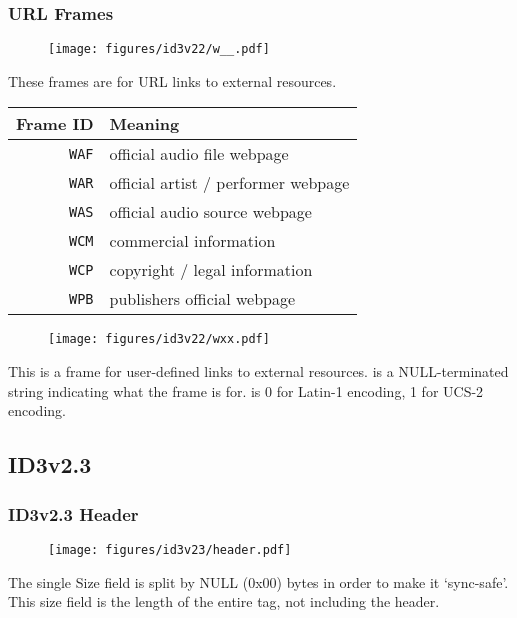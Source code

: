 \subsubsection{URL Frames}
\begin{figure}[h]
\texttt{[image: figures/id3v22/w\_\_.pdf]}
\end{figure}
These frames are for URL links to external resources.
\par
\begin{table}[h]
\begin{tabular}{|r|l|}
\hline
Frame ID & Meaning \\
\hline
\texttt{WAF} & official audio file webpage \\
\texttt{WAR} & official artist / performer webpage \\
\texttt{WAS} & official audio source webpage \\
\texttt{WCM} & commercial information \\
\texttt{WCP} & copyright / legal information \\
\texttt{WPB} & publishers official webpage \\
\hline
\end{tabular}
\end{table}
\begin{figure}[h]
\texttt{[image: figures/id3v22/wxx.pdf]}
\end{figure}
This is a frame for user-defined links to external resources.
 is a NULL-terminated string indicating
what the frame is for.
 is 0 for Latin-1 encoding, 1 for UCS-2 encoding.

\clearpage

\subsection{ID3v2.3}
\subsubsection{ID3v2.3 Header}
\begin{figure}[h]
\texttt{[image: figures/id3v23/header.pdf]}
\end{figure}
\par
\noindent
The single Size field is split by NULL (0x00) bytes in order to make
it `sync-safe'.
This size field is the length of the entire tag, not including the header.

